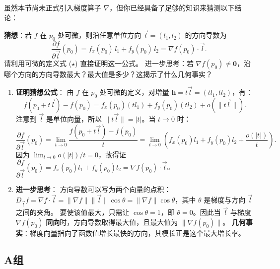 \documentclass[lang=cn,11pt]{elegantbook}
\begin{document}
\begin{exercise}[方向导数与梯度的关系预告]
虽然本节尚未正式引入梯度算子 $\nabla$，但你已经具备了足够的知识来猜测以下结论：

\textbf{猜想}：若 $f$ 在 $p_0$ 处可微，则沿任意单位方向 $\vec l=(l_1,l_2)$ 的方向导数为
\[
\frac{\partial f}{\partial\vec l}(p_0)=f_x(p_0)\,l_1+f_y(p_0)\,l_2 = \nabla f(p_0)\cdot\vec l.
\]
请利用可微的定义式 ($\star$) 直接证明这一公式。
进一步思考：若 $\nabla f(p_0) \neq \boldsymbol 0$，沿哪个方向的方向导数最大？最大值是多少？这揭示了什么几何事实？
\end{exercise}
\begin{solution}
\begin{enumerate}
  \item \textbf{证明猜想公式}：
  由 $f$ 在 $p_0$ 处可微的定义，对增量 $\boldsymbol h = t\vec l = (tl_1, tl_2)$，有：
  \[
  f(p_0 + t\vec l) - f(p_0) = f_x(p_0)(tl_1) + f_y(p_0)(tl_2) + o(\|t\vec l\|).
  \]
  注意到 $\vec l$ 是单位向量，所以 $\|t\vec l\| = |t|$。当 $t \to 0$ 时：
  \[
  \frac{\partial f}{\partial\vec l}(p_0) = \lim_{t \to 0} \frac{f(p_0 + t\vec l) - f(p_0)}{t} = \lim_{t \to 0} \left( f_x(p_0)l_1 + f_y(p_0)l_2 + \frac{o(|t|)}{t} \right).
  \]
  因为 $\lim_{t \to 0} o(|t|)/t = 0$，故得证 $\dfrac{\partial f}{\partial\vec l}(p_0) = f_x(p_0)l_1 + f_y(p_0)l_2 = \nabla f(p_0)\cdot\vec l$。
  
  \item \textbf{进一步思考}：
  方向导数可以写为两个向量的点积：$D_{\vec l} f = \nabla f \cdot \vec l = \|\nabla f\| \|\vec l\| \cos\theta = \|\nabla f\| \cos\theta$，其中 $\theta$ 是梯度与方向 $\vec l$ 之间的夹角。
  要使该值最大，只需让 $\cos\theta = 1$，即 $\theta = 0$。因此当 $\vec l$ 与梯度 $\nabla f(p_0)$ \textbf{同向}时，方向导数取得最大值，且最大值为 $\|\nabla f(p_0)\|$。
  \textbf{几何事实}：梯度向量指向了函数值增长最快的方向，其模长正是这个最大增长率。
\end{enumerate}
\end{solution}

\subsection{A组}
\end{document}
